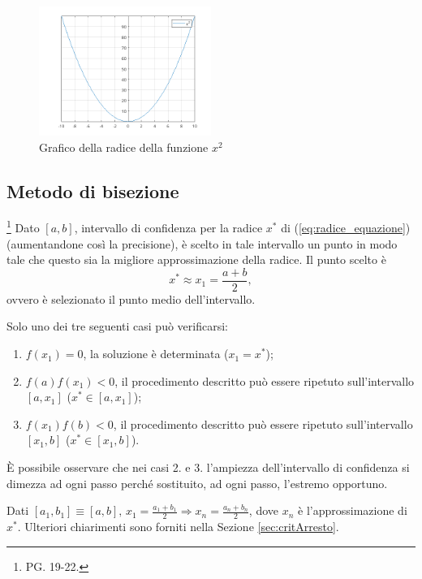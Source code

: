 
\begin{figure}
	\centering
	\includegraphics[width=0.5\textwidth]{immagini/Radix.png}
	\caption{\label{fig:SingleRadix}Grafico della radice della funzione $x^2$}
\end{figure}

\subsection{Metodo di bisezione}\footnote{PG. 19-22.}
Dato $[a,b]$, intervallo di confidenza per la radice $x^*$ di (\ref{eq:radice_equazione}) (aumentandone così la
precisione), è scelto in tale intervallo un punto in modo tale che questo sia la migliore approssimazione della radice. Il punto scelto è 
\begin{equation*}
	x^*\approx x_1=\frac{a+b}{2},
\end{equation*}
ovvero è selezionato il punto medio dell'intervallo.

Solo uno dei tre seguenti casi può verificarsi:
\begin{enumerate}
	\item $f(x_1)=0$, la soluzione è determinata ($x_1=x^*$);
	\item $f(a)f(x_1)<0$, il procedimento descritto può essere ripetuto sull'intervallo $[a, x_1]$ ($x^*\in[a, x_1]$);
	\item $f(x_1)f(b)<0$, il procedimento descritto può essere ripetuto sull'intervallo $[x_1, b]$ ($x^*\in[x_1, b]$).
\end{enumerate}

\begin{remark}
	È possibile osservare che nei casi 2. e 3. l'ampiezza dell'intervallo di confidenza si dimezza ad ogni passo perché sostituito, ad ogni passo, l'estremo opportuno.
\end{remark}

\begin{remark}
	Dati $[a_1,b_1]\equiv [a,b],\, x_1=\frac{a_1+b_1}{2}\Rightarrow x_n=\frac{a_n+b_n}{2}$, dove $x_n$ è l'approssimazione di $x^*$. Ulteriori chiarimenti sono forniti nella Sezione \ref{sec:critArresto}.
\end{remark}

